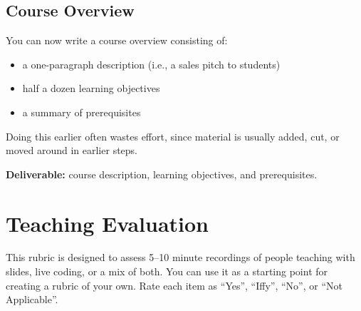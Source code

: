 \subsection{Course Overview}

You can now write a course overview consisting of:

\begin{itemize}
\item
  a one-paragraph description (i.e., a sales pitch to students)
\item
  half a dozen learning objectives
\item
  a summary of prerequisites
\end{itemize}

Doing this earlier often wastes effort, since material is usually added,
cut, or moved around in earlier steps.

\textbf{Deliverable:} course description, learning objectives, and
prerequisites.

\section{Teaching Evaluation}\label{s:checklists-teacheval}

This rubric is designed to assess 5--10 minute recordings of people
teaching with slides, live coding, or a mix of both. You can use it as
a starting point for creating a rubric of your own. Rate each item as
``Yes'', ``Iffy'', ``No'', or ``Not Applicable''.

